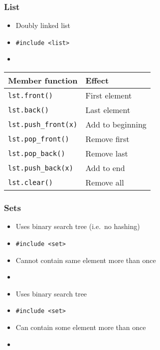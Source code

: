 \begin{frame}
  \frametitle{List}
  \begin{itemize}
    \item Doubly linked list
    \item \texttt{\#include <list>}
    \item {}
  \end{itemize}
  \begin{center}
    \begin{tabular}{ll}
      \textbf{Member function} & \textbf{Effect} \\
      \toprule
      \texttt{lst.front()}        & First element \\
      \texttt{lst.back()}         & Last element \\
      \texttt{lst.push\_front(x)} & Add to beginning \\
      \texttt{lst.pop\_front()}   & Remove first \\
      \texttt{lst.pop\_back()}    & Remove last \\
      \texttt{lst.push\_back(x)}  & Add to end \\
      \texttt{lst.clear()}        & Remove all \\
    \end{tabular}
  \end{center}
\end{frame}

\begin{frame}
  \frametitle{Sets}
  \begin{itemize}
    \item Uses binary search tree (i.e.~no hashing)
    \item \texttt{\#include <set>}
    \item Cannot contain same element more than once
    \item {}
  \end{itemize}
  \vskip5mm
  \begin{itemize}
    \item Uses binary search tree
    \item \texttt{\#include <set>}
    \item Can contain some element more than once
    \item {}
  \end{itemize}
\end{frame}

